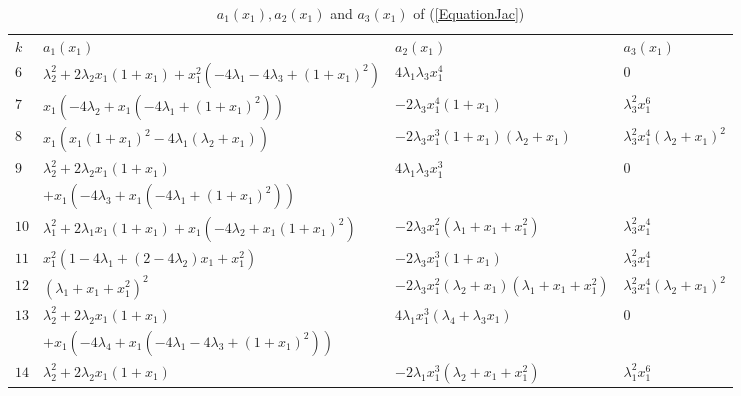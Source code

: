 \documentclass[10pt]{article}
\begin{document}
\vspace{-2.5mm}
{\small
\begin{longtable}{llll}
  \caption{\normalsize{$a_1(x_1), a_2(x_1)$ and $a_3(x_1)$ of (\ref{EquationJac})}}
  \vspace{-2.5mm}\\
\hline
  $k$ &  $a_1(x_1) $ &$a_2(x_1)$ & $a_3(x_1)$    
     \\
  \hline
  \endhead
\vspace{1mm}$6$ & $\lambda_2^2 + 2 \lambda_2 x_1 (1 + x_1) + x_1^2 (-4 \lambda_1 - 4 \lambda_3 + (1 + x_1)^2)$ & $4 \lambda_1 \lambda_3  x_1^4$ & $0$  \\
\vspace{1mm}$7$ & $x_1 (-4 \lambda_2 + x_1 (-4 \lambda_1 + (1 + x_1)^2))$ & $-2 \lambda_3 x_1^4 (1 + x_1)$ & $\lambda_3^2 x_1^6$ \\
\vspace{1mm}$8$ & $x_1 (x_1 (1 + x_1)^2 - 4 \lambda_1 (\lambda_2 + x_1))$ & $-2 \lambda_3 x_1^3 (1 + x_1) (\lambda_2 + x_1)$ & $\lambda_3^2 x_1^4 (\lambda_2 + x_1)^2$ \\
\vspace{0mm}$9$ & $\lambda_2^2 + 2 \lambda_2 x_1 (1 + x_1) $ & $4 \lambda_1 \lambda_3  x_1^3$ & $0$ \\
\vspace{1mm}& $+ x_1 (-4 \lambda_3 + x_1 (-4 \lambda_1 + (1 + x_1)^2))$ & & \\
\vspace{1mm}$10$ & $\lambda_1^2 + 2 \lambda_1 x_1 (1 + x_1) + x_1 (-4 \lambda_2 + x_1 (1 + x_1)^2)$ & $-2 \lambda_3 x_1^2 (\lambda_1 + x_1 + x_1^2)$ & $\lambda_3^2 x_1^4$ \\
\vspace{1mm}$11$ & $x_1^2 (1 - 4 \lambda_1 + (2 - 4 \lambda_2) x_1 + x_1^2)$ & $-2 \lambda_3 x_1^3 (1 + x_1)$ & $\lambda_3^2 x_1^4$\\
\vspace{1mm}$12$ & $(\lambda_1 + x_1 + x_1^2)^2$ & $-2 \lambda_3 x_1^2 (\lambda_2 + x_1) (\lambda_1 + x_1 + x_1^2)$ & $\lambda_3^2 x_1^4 (\lambda_2 + x_1)^2$\\
\vspace{0mm}$13$ & $\lambda_2^2 + 2 \lambda_2 x_1 (1 + x_1) $ & $4 \lambda_1 x_1^3 (\lambda_4 + \lambda_3 x_1)$ & $0$\\
\vspace{1mm} & $+ x_1 (-4 \lambda_4 + x_1 (-4 \lambda_1 - 4 \lambda_3 + (1 + x_1)^2))$ & &  \\
\vspace{0mm}$14$ & $\lambda_2^2 + 2 \lambda_2 x_1 (1 + x_1) $ & $-2 \lambda_1 x_1^3 (\lambda_2 + x_1 + x_1^2)$ & $\lambda_1^2 x_1^6$\\

\end{longtable}}
\end{document}
